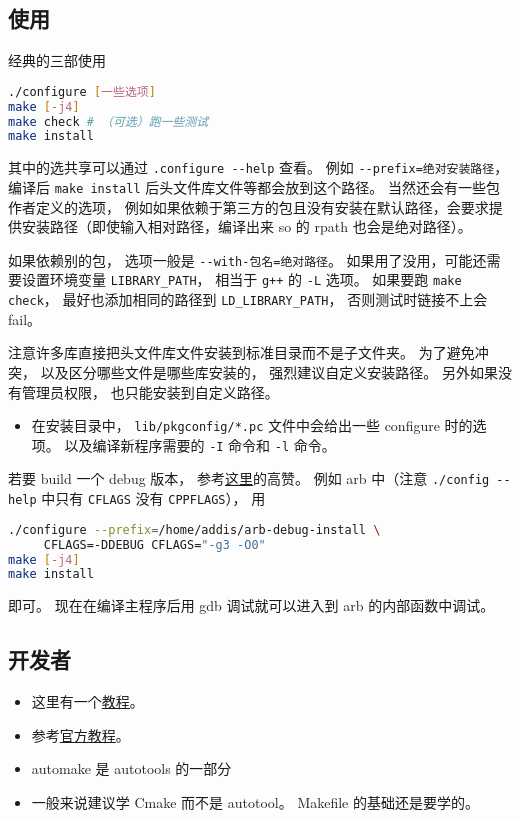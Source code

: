 
\begin{issues}
\issueDraft
\end{issues}



\subsection{使用}
经典的三部使用
\begin{lstlisting}[language=bash]
./configure [一些选项]
make [-j4]
make check # （可选）跑一些测试
make install
\end{lstlisting}
其中的选共享可以通过 \verb|.configure --help| 查看。 例如 \verb|--prefix=绝对安装路径|， 编译后 \verb|make install| 后头文件库文件等都会放到这个路径。 当然还会有一些包作者定义的选项， 例如如果依赖于第三方的包且没有安装在默认路径，会要求提供安装路径（即使输入相对路径，编译出来 so 的 rpath 也会是绝对路径）。

如果依赖别的包， 选项一般是 \verb|--with-包名=绝对路径|。 如果用了没用，可能还需要设置环境变量 \verb|LIBRARY_PATH|， 相当于 \verb|g++| 的 \verb|-L| 选项。 如果要跑 \verb|make check|， 最好也添加相同的路径到 \verb|LD_LIBRARY_PATH|， 否则测试时链接不上会 fail。

注意许多库直接把头文件库文件安装到标准目录而不是子文件夹。 为了避免冲突， 以及区分哪些文件是哪些库安装的， 强烈建议自定义安装路径。 另外如果没有管理员权限， 也只能安装到自定义路径。

\begin{itemize}
\item 在安装目录中， \verb|lib/pkgconfig/*.pc| 文件中会给出一些 configure 时的选项。 以及编译新程序需要的 \verb|-I| 命令和 \verb|-l| 命令。
\end{itemize}

若要 build 一个 debug 版本， 参考\href{https://stackoverflow.com/questions/4553735/gnu-autotools-debug-release-targets}{这里}的高赞。 例如 arb 中（注意 \verb|./config --help| 中只有 \verb|CFLAGS| 没有 \verb|CPPFLAGS|）， 用
\begin{lstlisting}[language=bash]
./configure --prefix=/home/addis/arb-debug-install \
     CFLAGS=-DDEBUG CFLAGS="-g3 -O0"
make [-j4]
make install
\end{lstlisting}
即可。 现在在编译主程序后用 gdb 调试就可以进入到 arb 的内部函数中调试。

\subsection{开发者}
\begin{itemize}
\item 这里有一个\href{https://devmanual.gentoo.org/general-concepts/autotools/index.html}{教程}。
\item 参考\href{https://www.gnu.org/software/automake/manual/html_node/Autotools-Introduction.html}{官方教程}。
\item automake 是 autotools 的一部分
\item 一般来说建议学 Cmake 而不是 autotool。 Makefile 的基础还是要学的。
\end{itemize}
